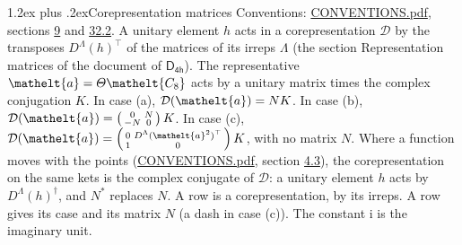 \documentclass[10pt,a4paper]{article}
\makeatletter
\renewcommand\section{\@startsection{section}{1}{\z@}{-3ex plus -1ex minus -.2ex}%
  {1.2ex plus .2ex}{\normalfont\large\sffamily\bfseries\color{parttitle}}}
\numberwithin{equation}{section}
\newcommand{\eltfont}[1]{{\let\sigma\eltsigma\mathelt{#1}}}
\newcommand{\grp}[1]{\mathsf{#1}}
\newcommand{\elt}[1]{\eltfont{#1}}
\newcommand{\iunit}{\mathrm{i}}
\makeatother
\begin{document}
\section{Corepresentation matrices}\label{s:corep_matrices}
Conventions: \href{../../CONVENTIONS.pdf}{CONVENTIONS.pdf}, sections \href{../../../rotation/CONVENTIONS.pdf\#conv.9}{9} and \href{../../CONVENTIONS.pdf\#conv.32.2}{32.2}.
A unitary element $h$ acts in a corepresentation $\mathcal{D}$ by the transposes $D^{\Lambda}(h)^{\top}$ of the matrices of its irreps $\Lambda$ (the section Representation matrices of the document of \href{../../../rotation/data/pdf/D4h.pdf}{$\grp{D_{4h}}$}). The representative $\elt{a} = \varTheta\elt{C_{8}}$ acts by a unitary matrix times the complex conjugation $K$.
In case (a), $\mathcal{D}(\elt{a}) = NK$. In case (b), $\mathcal{D}(\elt{a}) = \left(\begin{smallmatrix} 0 & N \\ -N & 0 \end{smallmatrix}\right) K$. In case (c), $\mathcal{D}(\elt{a}) = \left(\begin{smallmatrix} 0 & D^{\Lambda}(\elt{a}^2)^{\top} \\ 1 & 0 \end{smallmatrix}\right) K$, with no matrix $N$.
Where a function moves with the points (\href{../../CONVENTIONS.pdf}{CONVENTIONS.pdf}, section \href{../../../rotation/CONVENTIONS.pdf\#conv.4.3}{4.3}), the corepresentation on the same kets is the complex conjugate of $\mathcal{D}$: a unitary element $h$ acts by $D^{\Lambda}(h)^{\dagger}$, and $N^{*}$ replaces $N$.
A row is a corepresentation, by its irreps. A row gives its case and its matrix $N$ (a dash in case (c)).
The constant $\iunit$ is the imaginary unit.
\end{document}
